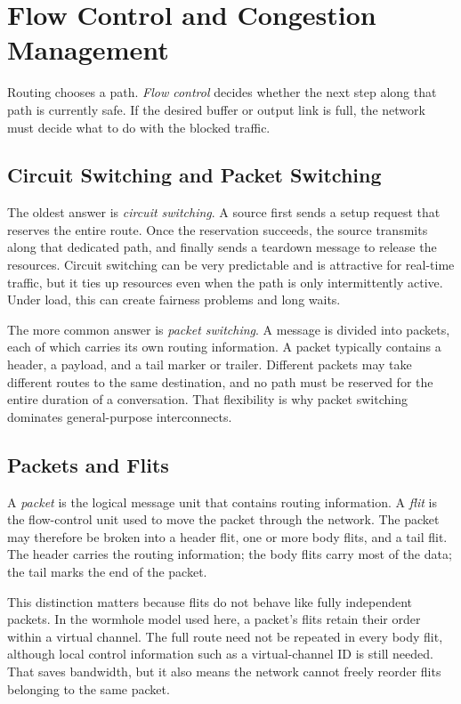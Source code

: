 \section{Flow Control and Congestion Management}\label{sec:pin-flow-control}
Routing chooses a path.
\textit{Flow control} decides whether the next step along that path is currently safe.
If the desired buffer or output link is full, the network must decide what to do with the blocked traffic.

\subsection{Circuit Switching and Packet Switching}\label{subsec:pin-switching-modes}
The oldest answer is \textit{circuit switching}.
A source first sends a setup request that reserves the entire route.
Once the reservation succeeds, the source transmits along that dedicated path, and finally sends a teardown message to release the resources.
Circuit switching can be very predictable and is attractive for real-time traffic, but it ties up resources even when the path is only intermittently active.
Under load, this can create fairness problems and long waits.

The more common answer is \textit{packet switching}.
A message is divided into packets, each of which carries its own routing information.
A packet typically contains a header, a payload, and a tail marker or trailer.
Different packets may take different routes to the same destination, and no path must be reserved for the entire duration of a conversation.
That flexibility is why packet switching dominates general-purpose interconnects.

\subsection{Packets and Flits}\label{subsec:pin-packets-flits}
A \textit{packet} is the logical message unit that contains routing information.
A \textit{flit} is the flow-control unit used to move the packet through the network.
The packet may therefore be broken into a header flit, one or more body flits, and a tail flit.
The header carries the routing information; the body flits carry most of the data; the tail marks the end of the packet.

This distinction matters because flits do not behave like fully independent packets.
In the wormhole model used here, a packet's flits retain their order within a virtual channel.
The full route need not be repeated in every body flit, although local control information such as a virtual-channel ID is still needed.
That saves bandwidth, but it also means the network cannot freely reorder flits belonging to the same packet.

